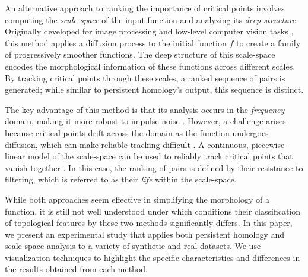 An alternative approach to ranking the importance of critical points involves computing the \emph{scale-space} of the input function and analyzing its \emph{deep structure}. 
Originally developed for image processing and low-level computer vision tasks \cite{lindeberg94}, this method applies a diffusion process to the initial function $f$ to create a family of progressively smoother functions. 
The deep structure of this scale-space encodes the morphological information of these functions across different scales. By tracking critical points through these scales, a ranked sequence of pairs is generated; while similar to persistent homology's output, this sequence is distinct.

The key advantage of this method is that its analysis occurs in the \emph{frequency} domain, making it more robust to impulse noise \cite{Rocca23}. 
However, a challenge arises because critical points drift across the domain as the function undergoes diffusion, which can make reliable tracking difficult \cite{reininghaus11}. 
A continuous, piecewise-linear model of the scale-space can be used to reliably track critical points that vanish together \cite{Rocca:2013}. 
In this case, the ranking of pairs is defined by their resistance to filtering, which is referred to as their \emph{life} within the scale-space.

While both approaches seem effective in simplifying the morphology of a function, it is still not well understood under which conditions their classification of topological features by these two methods significantly differs.
In this paper, we present an experimental study that applies both persistent homology and scale-space analysis to a variety of synthetic and real datasets. We use visualization techniques to highlight the specific characteristics and differences in the results obtained from each method.

